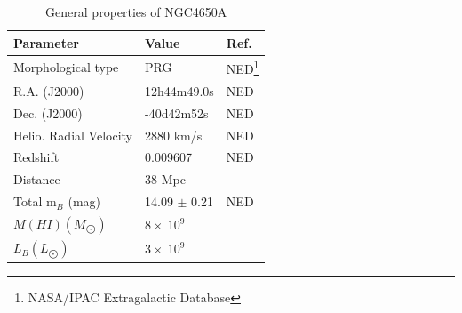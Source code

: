 \documentclass[12pt,preprint]{aastex}
\begin{document}
\begin{table}
\begin{minipage}[t]{\columnwidth}
\caption{General properties of NGC4650A}%
\label{General} %
\centering
\renewcommand{\footnoterule}{}  %
\begin{tabular}{l l l}        %
\hline\hline                 %
Parameter & Value & Ref. \\    %
\hline                        %
   Morphological type & PRG &  NED\footnote{NASA/IPAC Extragalactic Database}\\       %
   R.A. (J2000) & 12h44m49.0s & NED \\
   Dec. (J2000) & -40d42m52s & NED \\
   Helio. Radial Velocity & 2880 km/s & NED  \\
   Redshift & 0.009607 & NED     \\
   Distance & 38 Mpc &     \\
   Total m$_{B}$ (mag) & 14.09 $\pm$ 0.21 & NED \\
   $M(HI)(M_{\bigodot})$ & $8 \times\ 10^{9}$ & \cite{Arn97}\\
   $L_{B} (L_{\bigodot})$ & $3 \times\ 10^{9}$ & \\

\hline                      %
\end{tabular}
\end{minipage}
\end{table}

\clearpage
\end{document}
